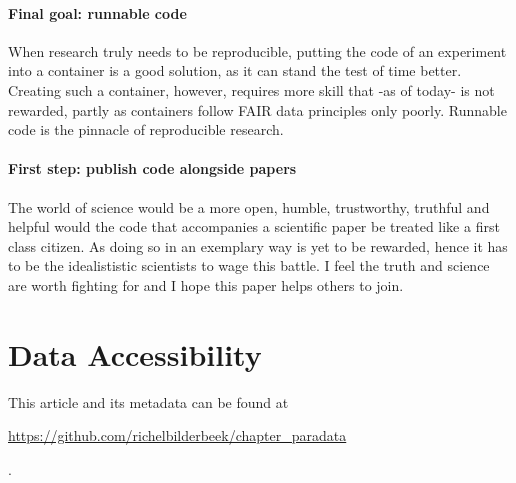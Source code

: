 \paragraph{Final goal: runnable code}

When research truly needs to be reproducible, putting the code 
of an experiment into a container is a good solution, as it 
can stand the test of time better.
Creating such a container, however, requires more skill
that -as of today- is not rewarded,
partly as containers follow FAIR data principles only poorly.
Runnable code is the pinnacle of reproducible research.

\paragraph{First step: publish code alongside papers}





The world of science would be a more open, humble, trustworthy, truthful
and helpful would the code that accompanies a scientific paper
be treated like a first class citizen. As doing so in an exemplary way
is yet to be rewarded, hence it has to be the idealististic scientists
to wage this battle. I feel the truth and science are worth fighting for
and I hope this paper helps others to join.

\section{Data Accessibility}

This article and its metadata can be found at 
\begin{sloppypar}\url{https://github.com/richelbilderbeek/chapter_paradata}\end{sloppypar}.




